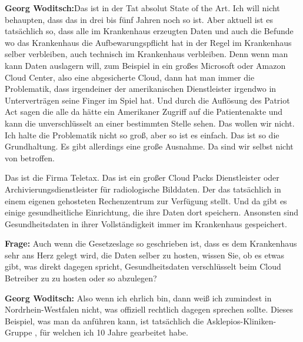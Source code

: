 \textbf{Georg Woditsch:}Das ist in der Tat absolut State of the Art. Ich will nicht behaupten, dass das in drei bis fünf Jahren noch so ist. Aber aktuell ist es tatsächlich so, dass alle im Krankenhaus erzeugten Daten und auch die Befunde wo das Krankenhaus die Aufbewarungspflicht hat in der Regel im Krankenhaus selber verbleiben, auch technisch im Krankenhaus verbleiben.
Denn wenn man kann  Daten auslagern will, zum Beispiel in ein großes Microsoft oder Amazon Cloud Center, also eine abgesicherte Cloud, dann hat man immer die Problematik, dass irgendeiner der amerikanischen Dienstleister irgendwo in Unterverträgen seine Finger im Spiel hat. Und durch die Auflösung des Patriot Act sagen die alle da hätte ein Amerikaner Zugriff auf die Patientenakte und kann die unverschlüsselt an einer bestimmten Stelle sehen. Das wollen wir nicht. Ich halte die Problematik nicht so groß, aber so ist es einfach. Das ist so die Grundhaltung. Es gibt allerdings eine große Ausnahme. Da sind wir selbst nicht von betroffen.

Das ist die Firma Teletax. Das ist ein großer Cloud Packs Dienstleister oder Archivierungsdienstleister für radiologische Bilddaten. Der das tatsächlich in einem eigenen gehosteten Rechenzentrum zur Verfügung stellt. Und da gibt es einige gesundheitliche Einrichtung, die ihre Daten dort speichern. Ansonsten sind Gesundheitsdaten in ihrer Vollständigkeit immer im Krankenhaus gespeichert.

\textbf{Frage: }Auch wenn die Gesetzeslage so geschrieben ist, dass es dem Krankenhaus sehr ans Herz gelegt wird, die Daten selber zu hosten, wissen Sie, ob es etwas gibt, was direkt dagegen spricht, Gesundheitsdaten verschlüsselt beim Cloud Betreiber zu zu hosten oder so abzulegen?

\textbf{Georg Woditsch: }Also wenn ich ehrlich bin, dann weiß ich zumindest in Nordrhein-Westfalen nicht, was offiziell rechtlich dagegen sprechen sollte. Dieses Beispiel, was man da anführen kann, ist tatsächlich die Asklepios-Kliniken-Gruppe , für welchen ich 10 Jahre gearbeitet habe.

